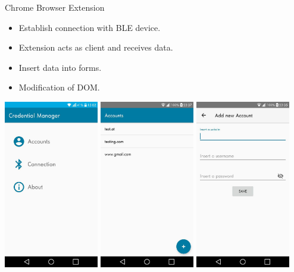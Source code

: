 \documentclass{beamer}
\begin{document}
\begin{frame}{Chrome Browser Extension}
\begin{itemize}
	\item Establish connection with BLE device.
	\item Extension acts as client and receives data.
	\item Insert data into forms.
	\item Modification of DOM.
\end{itemize}
\end{frame}


\begin{frame}{}
\vfill
\centering
\includegraphics[width=0.31\textwidth]{images/MainActivityNew.jpg}
\hspace{0.1cm}
\includegraphics[width=0.31\textwidth]{images/ShowAccountsActivity.jpg}
\hspace{0.1cm}
\includegraphics[width=0.31\textwidth]{images/AddAccountActivity.jpg}
\vfill
\end{frame}
\end{document}
